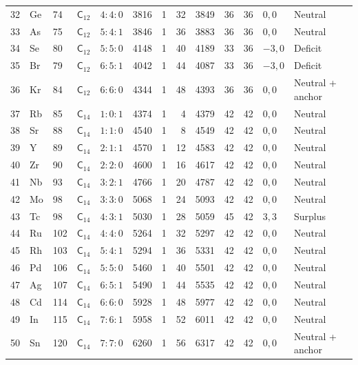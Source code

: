 {\begin{longtable}{@{}rllccrrrrrrll@{}}
32 & Ge & 74 & $\mathsf{C}_{12}$ & $4:4:0$ & 3816 & 1 & 32 & 3849 & 36 & 36 & $0,0$ & Neutral\\
33 & As & 75 & $\mathsf{C}_{12}$ & $5:4:1$ & 3846 & 1 & 36 & 3883 & 36 & 36 & $0,0$ & Neutral\\
34 & Se & 80 & $\mathsf{C}_{12}$ & $5:5:0$ & 4148 & 1 & 40 & 4189 & 33 & 36 & $-3,0$ & Deficit\\
35 & Br & 79 & $\mathsf{C}_{12}$ & $6:5:1$ & 4042 & 1 & 44 & 4087 & 33 & 36 & $-3,0$ & Deficit\\
36 & Kr & 84 & $\mathsf{C}_{12}$ & $6:6:0$ & 4344 & 1 & 48 & 4393 & 36 & 36 & $0,0$ & Neutral + anchor\\
37 & Rb & 85 & $\mathsf{C}_{14}$ & $1:0:1$ & 4374 & 1 & 4 & 4379 & 42 & 42 & $0,0$ & Neutral\\
38 & Sr & 88 & $\mathsf{C}_{14}$ & $1:1:0$ & 4540 & 1 & 8 & 4549 & 42 & 42 & $0,0$ & Neutral\\
39 & Y & 89 & $\mathsf{C}_{14}$ & $2:1:1$ & 4570 & 1 & 12 & 4583 & 42 & 42 & $0,0$ & Neutral\\
40 & Zr & 90 & $\mathsf{C}_{14}$ & $2:2:0$ & 4600 & 1 & 16 & 4617 & 42 & 42 & $0,0$ & Neutral\\
41 & Nb & 93 & $\mathsf{C}_{14}$ & $3:2:1$ & 4766 & 1 & 20 & 4787 & 42 & 42 & $0,0$ & Neutral\\
42 & Mo & 98 & $\mathsf{C}_{14}$ & $3:3:0$ & 5068 & 1 & 24 & 5093 & 42 & 42 & $0,0$ & Neutral\\
43 & Tc & 98 & $\mathsf{C}_{14}$ & $4:3:1$ & 5030 & 1 & 28 & 5059 & 45 & 42 & $3,3$ & Surplus\\
44 & Ru & 102 & $\mathsf{C}_{14}$ & $4:4:0$ & 5264 & 1 & 32 & 5297 & 42 & 42 & $0,0$ & Neutral\\
45 & Rh & 103 & $\mathsf{C}_{14}$ & $5:4:1$ & 5294 & 1 & 36 & 5331 & 42 & 42 & $0,0$ & Neutral\\
46 & Pd & 106 & $\mathsf{C}_{14}$ & $5:5:0$ & 5460 & 1 & 40 & 5501 & 42 & 42 & $0,0$ & Neutral\\
47 & Ag & 107 & $\mathsf{C}_{14}$ & $6:5:1$ & 5490 & 1 & 44 & 5535 & 42 & 42 & $0,0$ & Neutral\\
48 & Cd & 114 & $\mathsf{C}_{14}$ & $6:6:0$ & 5928 & 1 & 48 & 5977 & 42 & 42 & $0,0$ & Neutral\\
49 & In & 115 & $\mathsf{C}_{14}$ & $7:6:1$ & 5958 & 1 & 52 & 6011 & 42 & 42 & $0,0$ & Neutral\\
50 & Sn & 120 & $\mathsf{C}_{14}$ & $7:7:0$ & 6260 & 1 & 56 & 6317 & 42 & 42 & $0,0$ & Neutral + anchor\\

\end{longtable}}
